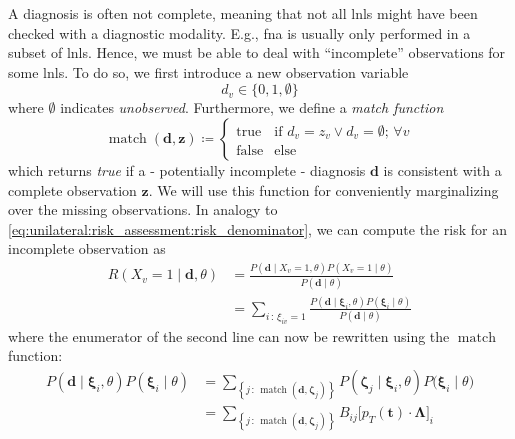\documentclass[\relativeRoot/main.tex]{subfiles}
\begin{document}
A diagnosis is often not complete, meaning that not all \glspl{lnl} might have been checked with a diagnostic modality. E.g., \gls{fna} is usually only performed in a subset of \glspl{lnl}. Hence, we must be able to deal with “incomplete” observations for some \glspl{lnl}. To do so, we first introduce a new observation variable
%
\begin{equation}
    d_v \in \{ 0, 1, \emptyset \}
\end{equation}
%
where $\emptyset$ indicates \emph{unobserved}. Furthermore, we define a \emph{match function}
%
\begin{equation}
    \operatorname{match}(\mathbf{d}, \mathbf{z}) \coloneqq 
    \begin{cases}
        \text{true} & \text{if} \,\, d_v = z_v \vee d_v = \emptyset ; \,\forall v \\
        \text{false} & \text{else}
    \end{cases}
\end{equation}
%
which returns \emph{true} if a - potentially incomplete - diagnosis $\mathbf{d}$ is consistent with a complete observation $\mathbf{z}$. We will use this function for conveniently marginalizing over the missing observations. In analogy to \cref{eq:unilateral:risk_assessment:risk_denominator}, we can compute the risk for an incomplete observation as
%
\begin{equation} \label{eq:unilateral:incomplete_diagnose:marg_risk}
    \begin{aligned}
        R \left( X_v=1 \mid \mathbf{d}, \theta \right) 
        &= \frac{P \left( \mathbf{d} \mid X_v=1, \theta \right) P \left( X_v=1 \mid \theta \right)}{P \left( \mathbf{d} \mid \theta \right)} \\
        &= \sum_{i\,:\,\xi_{iv}=1}{\frac{P \left( \mathbf{d} \mid \boldsymbol{\xi}_i , \theta \right) P \left( \boldsymbol{\xi}_i \mid \theta \right)}{P \left( \mathbf{d} \mid \theta \right)}}
    \end{aligned}
\end{equation}
%
where the enumerator of the second line can now be rewritten using the $\operatorname{match}$ function:
%
\begin{equation}
    \begin{aligned}
        P \left( \mathbf{d} \mid \boldsymbol{\xi}_i , \theta \right) P \left( \boldsymbol{\xi}_i \mid \theta \right) 
        &= \sum_{\left\{ j \,:\, \operatorname{match}(\mathbf{d}, \boldsymbol{\zeta}_j) \right\}}{ P \left( \boldsymbol{\zeta}_j \mid \boldsymbol{\xi}_i , \theta \right)} P \Big( \boldsymbol{\xi}_i \mid \theta \Big) \\
        &= \sum_{\left\{ j \,:\, \operatorname{match}(\mathbf{d}, \boldsymbol{\zeta}_j) \right\}}{B_{ij} \Big[ p_T\left( \mathbf{t} \right) \cdot \boldsymbol{\Lambda} \Big]_i}
    \end{aligned}
\end{equation}
\end{document}
